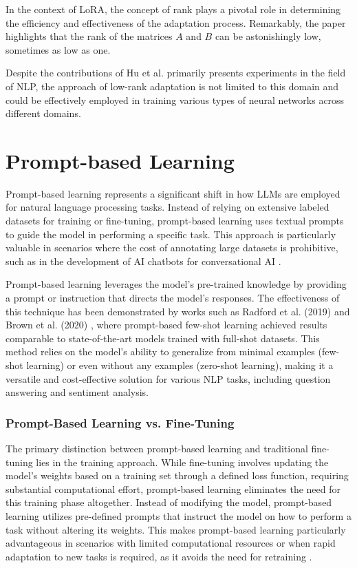 In the context of LoRA, the concept of rank plays a pivotal role in determining the efficiency and effectiveness of the adaptation process. Remarkably, the paper highlights that the rank of the matrices \( A \) and \( B \) can be astonishingly low, sometimes as low as one.

Despite the contributions of Hu et al. \cite{hu2021lora} primarily presents experiments in the field of NLP, the approach of low-rank adaptation is not limited to this domain and could be effectively employed in training various types of neural networks across different domains.

\section{Prompt-based Learning}

Prompt-based learning represents a significant shift in how LLMs are employed for natural language processing tasks. Instead of relying on extensive labeled datasets for training or fine-tuning, prompt-based learning uses textual prompts to guide the model in performing a specific task. This approach is particularly valuable in scenarios where the cost of annotating large datasets is prohibitive, such as in the development of AI chatbots for conversational AI \cite{madotto2021few}.

Prompt-based learning leverages the model's pre-trained knowledge by providing a prompt or instruction that directs the model's responses. The effectiveness of this technique has been demonstrated by works such as Radford et al. (2019) \cite{radford2019language} and Brown et al. (2020) \cite{brown2020language}, where prompt-based few-shot learning achieved results comparable to state-of-the-art models trained with full-shot datasets. This method relies on the model's ability to generalize from minimal examples (few-shot learning) or even without any examples (zero-shot learning), making it a versatile and cost-effective solution for various NLP tasks, including question answering and sentiment analysis.

\subsubsection{Prompt-Based Learning vs. Fine-Tuning}

The primary distinction between prompt-based learning and traditional fine-tuning lies in the training approach. While fine-tuning involves updating the model's weights based on a training set through a defined loss function, requiring substantial computational effort, prompt-based learning eliminates the need for this training phase altogether. Instead of modifying the model, prompt-based learning utilizes pre-defined prompts that instruct the model on how to perform a task without altering its weights. This makes prompt-based learning particularly advantageous in scenarios with limited computational resources or when rapid adaptation to new tasks is required, as it avoids the need for retraining \cite{madotto2021few}. 


